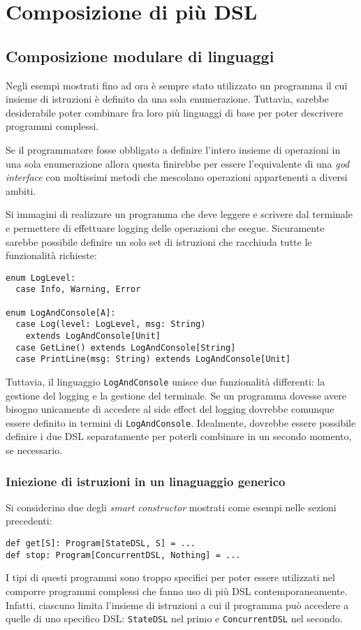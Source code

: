 \section{Composizione di più DSL}

\subsection{Composizione modulare di linguaggi}
Negli esempi mostrati fino ad ora è sempre stato utilizzato un programma il cui insieme di istruzioni è definito da una sola enumerazione. Tuttavia, sarebbe desiderabile poter combinare fra loro più linguaggi di base per poter descrivere programmi complessi.

Se il programmatore fosse obbligato a definire l'intero insieme di operazioni in una sola enumerazione allora questa finirebbe per essere l'equivalente di una \emph{god interface} con moltissimi metodi che mescolano operazioni appartenenti a diversi ambiti.

Si immagini di realizzare un programma che deve leggere e scrivere dal terminale e permettere di effettuare logging delle operazioni che esegue. Sicuramente sarebbe possibile definire un solo set di istruzioni che racchiuda tutte le funzionalità richieste:
\begin{lstlisting}[language=scala3]
enum LogLevel:
  case Info, Warning, Error

enum LogAndConsole[A]:
  case Log(level: LogLevel, msg: String)
    extends LogAndConsole[Unit]
  case GetLine() extends LogAndConsole[String]
  case PrintLine(msg: String) extends LogAndConsole[Unit]
\end{lstlisting}
Tuttavia, il linguaggio \lstinline{LogAndConsole} unisce due funzionalità differenti: la gestione del logging e la gestione del terminale.
Se un programma dovesse avere bisogno unicamente di accedere al side effect del logging dovrebbe comunque essere definito in termini di \lstinline{LogAndConsole}.
Idealmente, dovrebbe essere possibile definire i due DSL separatamente per poterli combinare in un secondo momento, se necessario.

\subsubsection{Iniezione di istruzioni in un linaguaggio generico}
Si considerino due degli \emph{smart constructor} mostrati come esempi nelle sezioni precedenti:
\begin{lstlisting}[language=scala3]
def get[S]: Program[StateDSL, S] = ...
def stop: Program[ConcurrentDSL, Nothing] = ...
\end{lstlisting}
I tipi di questi programmi sono troppo specifici per poter essere utilizzati nel comporre programmi complessi che fanno uso di più DSL contemporaneamente. Infatti, ciascuno limita l'insieme di istruzioni a cui il programma può accedere a quelle di uno specifico DSL: \lstinline{StateDSL} nel primo e \lstinline{ConcurrentDSL} nel secondo.

